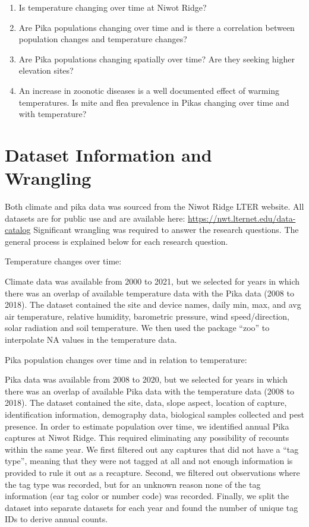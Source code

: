 \documentclass[
  12pt,
]{article}
\providecommand{\tightlist}{%
  \setlength{\itemsep}{0pt}\setlength{\parskip}{0pt}}
\begin{document}
\begin{enumerate}
\def\labelenumi{\arabic{enumi}.}
\tightlist
\item
  Is temperature changing over time at Niwot Ridge?
\item
  Are Pika populations changing over time and is there a correlation
  between population changes and temperature changes?
\item
  Are Pika populations changing spatially over time? Are they seeking
  higher elevation sites?
\item
  An increase in zoonotic diseases is a well documented effect of
  warming temperatures. Is mite and flea prevalence in Pikas changing
  over time and with temperature?
\end{enumerate}

\newpage

\hypertarget{dataset-information-and-wrangling}{%
\section{Dataset Information and
Wrangling}\label{dataset-information-and-wrangling}}

Both climate and pika data was sourced from the Niwot Ridge LTER
website. All datasets are for public use and are available here:
\url{https://nwt.lternet.edu/data-catalog} Significant wrangling was
required to answer the research questions. The general process is
explained below for each research question.

Temperature changes over time:

Climate data was available from 2000 to 2021, but we selected for years
in which there was an overlap of available temperature data with the
Pika data (2008 to 2018). The dataset contained the site and device
names, daily min, max, and avg air temperature, relative humidity,
barometric pressure, wind speed/direction, solar radiation and soil
temperature. We then used the package ``zoo'' to interpolate NA values
in the temperature data.

Pika population changes over time and in relation to temperature:

Pika data was available from 2008 to 2020, but we selected for years in
which there was an overlap of available Pika data with the temperature
data (2008 to 2018). The dataset contained the site, data, slope aspect,
location of capture, identification information, demography data,
biological samples collected and pest presence. In order to estimate
population over time, we identified annual Pika captures at Niwot Ridge.
This required eliminating any possibility of recounts within the same
year. We first filtered out any captures that did not have a ``tag
type'', meaning that they were not tagged at all and not enough
information is provided to rule it out as a recapture. Second, we
filtered out observations where the tag type was recorded, but for an
unknown reason none of the tag information (ear tag color or number
code) was recorded. Finally, we split the dataset into separate datasets
for each year and found the number of unique tag IDs to derive annual
counts.
\end{document}
